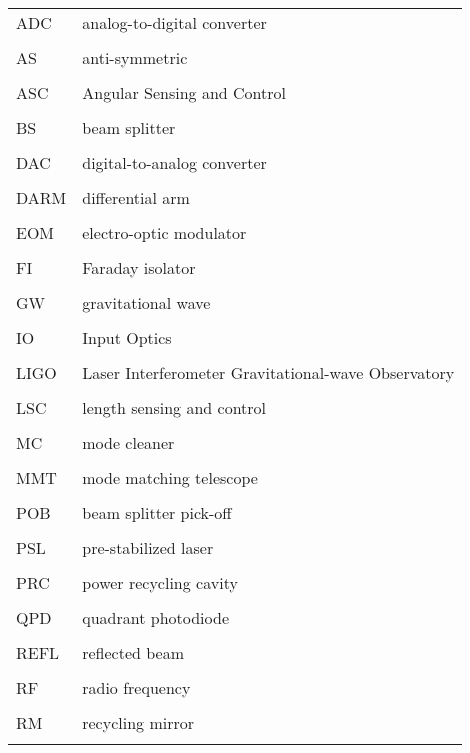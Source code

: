 \singlespacing
\begin{tabular}{lp{5in}}
ADC & analog-to-digital converter \\
\\
AS & anti-symmetric \\
\\
ASC & Angular Sensing and Control \\
\\
BS & beam splitter \\
\\
DAC & digital-to-analog converter\\
\\
DARM & differential arm \\
\\
EOM & electro-optic modulator \\
\\
FI & Faraday isolator \\
\\
GW & gravitational wave \\
\\
IO & Input Optics \\
\\
LIGO & Laser Interferometer Gravitational-wave Observatory \\
\\
LSC & length sensing and control \\
\\
MC & mode cleaner \\
\\
MMT & mode matching telescope \\
\\
POB & beam splitter pick-off \\
\\
PSL & pre-stabilized laser \\
\\
PRC & power recycling cavity \\
\\
QPD & quadrant photodiode \\
\\
REFL & reflected beam \\
\\
RF & radio frequency \\
\\
RM & recycling mirror \\
\\
\end{tabular}
\doublespacing



